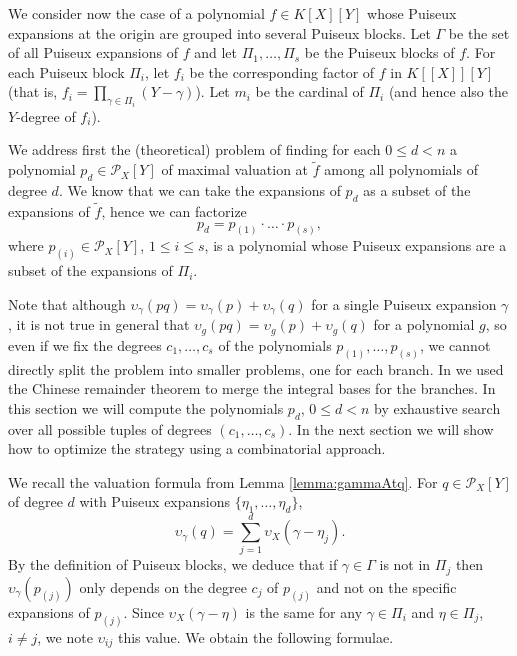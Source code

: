 \documentclass[a4paper,11pt]{amsart}%
\theoremstyle{definition}
\theoremstyle{plain}
\theoremstyle{remark}
\newcommand{\Px}{{\mathcal{P}_X}}
\begin{document}

We consider now the case of a polynomial $f \in K[X][Y]$ whose Puiseux expansions at the origin are grouped into several Puiseux blocks.
Let $\Gamma$ be the set of all Puiseux expansions of $f$ and let $\Pi_1, \dots, \Pi_s$ be the Puiseux blocks of $f$.
For each Puiseux block $\Pi_{i}$, let $f_i$ be the corresponding
factor of $f$ in $K[[X]][Y]$ (that is, $f_i = \prod_{\gamma \in \Pi_i} (Y - \gamma)$). Let $m_i$ be the cardinal of $\Pi_i$ (and hence also the $Y$-degree of $f_i$).

We address first the (theoretical) problem of finding for each $0 \le d < n$ a polynomial $p_d \in \Px[Y]$ of maximal valuation at $\tilde f$ among all polynomials of degree $d$.
We know that we can take the expansions of $p_d$ as a subset of the expansions of $\tilde f$, hence we can factorize
$$
p_d = p_{(1)} \cdot \dots \cdot p_{(s)},
$$
where $p_{(i)} \in \mathcal{P}_{X}[Y]$, $1 \le i \le s$, is a polynomial whose Puiseux expansions are a subset of the expansions of $\Pi_i$.

Note that although $\upsilon_{\gamma}(pq) = \upsilon_{\gamma}(p) + \upsilon_{\gamma}(q)$ for a single Puiseux expansion $\gamma$, it is not true in general that $\upsilon_{g}(pq) = \upsilon_{g}(p) + \upsilon_{g}(q)$ for a polynomial $g$, so even if we fix the degrees $c_1, \dots, c_s$ of the polynomials $p_{(1)}, \dots, p_{(s)}$, we cannot directly split the problem into smaller problems, one for each branch. In \cite{intbas} we used the Chinese remainder theorem to merge the integral bases for the branches. In this section we will compute the polynomials $p_d$, $0 \le d < n$ by exhaustive search over all possible tuples of degrees $(c_1, \dots, c_s)$. In the next section we will show how to optimize the strategy using a combinatorial approach.

We recall the valuation formula from Lemma \ref{lemma:gammaAtq}. For $q \in \mathcal{P}_{X}[Y]$ of degree $d$ with Puiseux expansions $\{\eta_1, \dots, \eta_d\}$,
$$
\upsilon_{\gamma}(q)= \sum_{j=1}^{d}\upsilon_X(\gamma-\eta_{j}).
$$
By the definition of Puiseux blocks, we deduce that if $\gamma \in \Gamma$ is not in $\Pi_{j}$ then $\upsilon_{\gamma} (p_{(j)})$ only depends on the degree $c_j$ of $p_{(j)}$ and not on the specific expansions of $p_{(j)}$.
Since $\upsilon_X(\gamma - \eta)$ is the same for any $\gamma \in\Pi_{i}$ and $\eta \in \Pi_j$, $i \ne j$, we note $\upsilon_{ij}$ this value. We obtain the following formulae.
\end{document}
